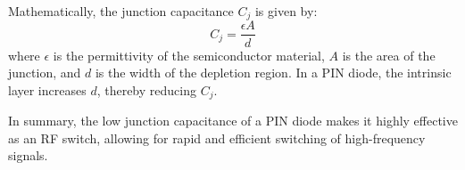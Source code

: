 Mathematically, the junction capacitance \( C_j \) is given by:
\[
C_j = \frac{\epsilon A}{d}
\]
where \( \epsilon \) is the permittivity of the semiconductor material, \( A \) is the area of the junction, and \( d \) is the width of the depletion region. In a PIN diode, the intrinsic layer increases \( d \), thereby reducing \( C_j \).

In summary, the low junction capacitance of a PIN diode makes it highly effective as an RF switch, allowing for rapid and efficient switching of high-frequency signals.

